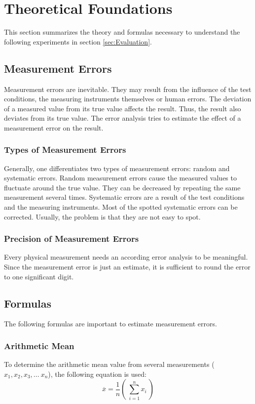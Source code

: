 \section{Theoretical Foundations}
\label{sec:Theoretical_Foundations}
This section summarizes the theory and formulas necessary to understand the following experiments in section \ref{sec:Evaluation}.

\subsection{Measurement Errors}
\label{subsec:Measurement_Errors}
Measurement errors are inevitable. They may result from the influence of the test conditions, the measuring instruments themselves or human errors. The deviation of a measured value from its true value affects the result. Thus, the result also deviates from its true value. The error analysis tries to estimate the effect of a measurement error on the result.

\subsubsection{Types of Measurement Errors}
\label{subsubsec:Types_of_Measurement_Errors}
Generally, one differentiates two types of measurement errors: random and systematic errors. Random measurement errors cause the measured values to fluctuate around the true value. They can be decreased by repeating the same measurement several times. Systematic errors are a result of the test conditions and the measuring instruments. Most of the spotted systematic errors can be corrected. Usually, the problem is that they are not easy to spot.

\subsubsection{Precision of Measurement Errors}
\label{subsubsec:Precision_of_Measurement_Errors}
Every physical measurement needs an according error analysis to be meaningful. Since the measurement error is just an estimate, it is sufficient to round the error to one significant digit.

\subsection{Formulas}
\label{subsec:Formulas}
The following formulas are important to estimate measurement errors.

\subsubsection{Arithmetic Mean}
\label{subsubsec:Arithmetic_Mean}
To determine the arithmetic mean value from several measurements ($x_1, x_2, x_3, ...\ x_n$), the following equation is used:
\begin{equation}
\overline x=\frac{1}{n}\left(\ \sum_{i=1}^{n} x_i\ \right)
\label{eq:Arithmetic_Mean}
\end{equation}

